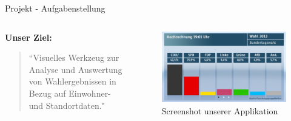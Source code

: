 \documentclass[ucs,9pt]{beamer}
\begin{document}
\begin{frame}{Projekt - Aufgabenstellung}
	\begin{columns}[c] %
  		\begin{column}[T]{0.4\textwidth} %
			\textbf{Unser Ziel:}
			\begin{quote}
				``Visuelles Werkzeug zur Analyse und Auswertung von Wahlergebnissen in Bezug auf Einwohner- und Standortdaten."
			\end{quote}					
		\end{column}
		\begin{column}[T]{0.45\textwidth} %
			\begin{figure}[hbtp]
				\centering
				\includegraphics[scale=0.3]{ergebniswahl.png}
				\caption{Screenshot unserer Applikation}
			\end{figure}
  		\end{column}
  	\end{columns}
\end{frame}
\end{document}
